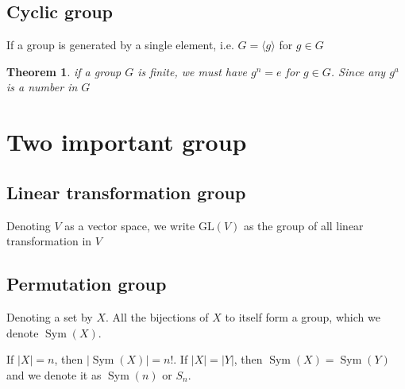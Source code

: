 \documentclass{amsart}
\newtheorem{theorem}{Theorem}
\DeclareMathOperator{\Sym}{Sym}
\begin{document}
\subsection*{Cyclic group}
    If a group is generated by a single element, i.e. $G = \langle g \rangle$ for $g \in G$

\begin{theorem}
    if a group $G$ is finite, we must have $g^n = e$ for $g \in G$. Since any $g^a$ is a number in $G$
\end{theorem}


\section*{Two important group}

\subsection*{Linear transformation group}
Denoting $V$ as a vector space, we write $\text{GL}(V)$ as the group of all linear transformation in $V$

\subsection*{Permutation group}
Denoting a set by $X$. All the bijections of $X$ to itself form a group, which we denote $\Sym(X)$. 

If $|X| = n$, then $|\Sym(X)| = n!$.
If $|X| = |Y|$, then $\Sym(X) = \Sym(Y)$ and we denote it as $\Sym(n)$ or $S_n$.
\end{document}
